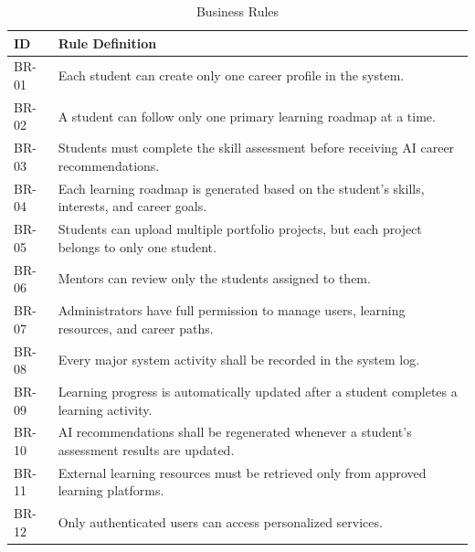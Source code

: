 \begin{table}[H]
\centering
\caption{Business Rules}
\begin{tabularx}{\textwidth}{|p{2cm}|X|}
\hline
\rowcolor{gray!20}
\textbf{ID} & \textbf{Rule Definition} \\
\hline

BR-01 &
Each student can create only one career profile in the system. \\
\hline

BR-02 &
A student can follow only one primary learning roadmap at a time. \\
\hline

BR-03 &
Students must complete the skill assessment before receiving AI career recommendations. \\
\hline

BR-04 &
Each learning roadmap is generated based on the student's skills, interests, and career goals. \\
\hline

BR-05 &
Students can upload multiple portfolio projects, but each project belongs to only one student. \\
\hline

BR-06 &
Mentors can review only the students assigned to them. \\
\hline

BR-07 &
Administrators have full permission to manage users, learning resources, and career paths. \\
\hline

BR-08 &
Every major system activity shall be recorded in the system log. \\
\hline

BR-09 &
Learning progress is automatically updated after a student completes a learning activity. \\
\hline

BR-10 &
AI recommendations shall be regenerated whenever a student's assessment results are updated. \\
\hline

BR-11 &
External learning resources must be retrieved only from approved learning platforms. \\
\hline

BR-12 &
Only authenticated users can access personalized services. \\
\hline

\end{tabularx}
\end{table}

